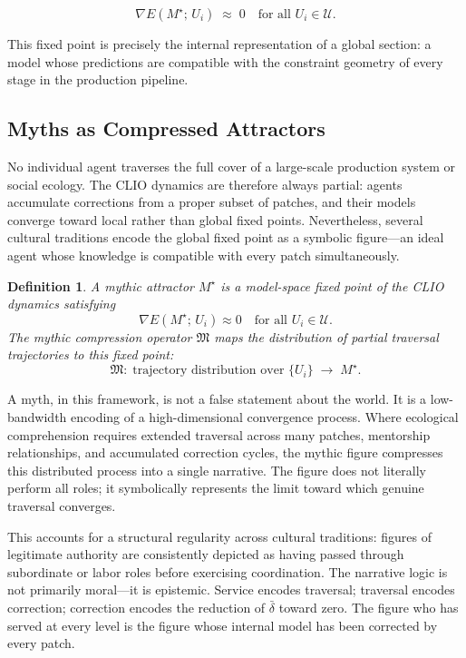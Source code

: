 \documentclass[12pt]{article}
\newtheorem{definition}{Definition}
\begin{document}
\begin{equation}
\nabla E(M^\star;\, U_i) \;\approx\; 0 \quad \text{for all } U_i \in \mathcal{U}.
\end{equation}

This fixed point is precisely the internal representation of a global section: a model whose predictions are compatible with the constraint geometry of every stage in the production pipeline.

\subsection{Myths as Compressed Attractors}

No individual agent traverses the full cover of a large-scale production system or social ecology. The CLIO dynamics are therefore always partial: agents accumulate corrections from a proper subset of patches, and their models converge toward local rather than global fixed points. Nevertheless, several cultural traditions encode the global fixed point as a symbolic figure---an ideal agent whose knowledge is compatible with every patch simultaneously.

\begin{definition}
A \emph{mythic attractor} $M^\star$ is a model-space fixed point of the CLIO dynamics satisfying
\[
\nabla E(M^\star;\, U_i) \approx 0 \quad \text{for all } U_i \in \mathcal{U}.
\]
The \emph{mythic compression operator} $\mathfrak{M}$ maps the distribution of partial traversal trajectories to this fixed point:
\begin{equation}
\mathfrak{M}:\; \text{trajectory distribution over } \{U_i\} \;\longrightarrow\; M^\star.
\end{equation}
\end{definition}

A myth, in this framework, is not a false statement about the world. It is a low-bandwidth encoding of a high-dimensional convergence process. Where ecological comprehension requires extended traversal across many patches, mentorship relationships, and accumulated correction cycles, the mythic figure compresses this distributed process into a single narrative. The figure does not literally perform all roles; it symbolically represents the limit toward which genuine traversal converges.

This accounts for a structural regularity across cultural traditions: figures of legitimate authority are consistently depicted as having passed through subordinate or labor roles before exercising coordination. The narrative logic is not primarily moral---it is epistemic. Service encodes traversal; traversal encodes correction; correction encodes the reduction of $\bar{\delta}$ toward zero. The figure who has served at every level is the figure whose internal model has been corrected by every patch.
\end{document}
